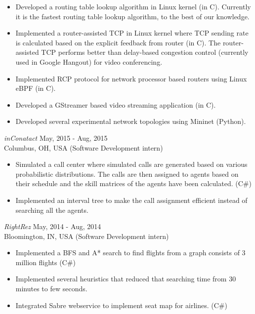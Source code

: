 \documentclass{res}
\begin{document}
\begin{resume}
   \begin{itemize} \itemsep -2pt %
  \item Developed a routing table lookup algorithm in Linux kernel (in C). Currently it is the fastest routing table lookup algorithm, to the best of our knowledge. 
  \item Implemented a router-assisted TCP in Linux kernel where TCP sending rate is calculated based on the explicit feedback from router (in C). The router-assisted TCP performs better than delay-based congestion control (currently used in Google Hangout) for video conferencing.  
  \item Implemented RCP protocol for network processor based routers using Linux eBPF (in C). 
  \item Developed a GStreamer based video streaming application (in C).
  \item Developed several experimental network topologies using Mininet (Python).    	
 \end{itemize}

{\sl inConatact}       \hfill               May, 2015 - Aug, 2015 \\
Columbus, OH, USA \hfill   (Software Development intern)
 \begin{itemize} \itemsep -2pt
	\item  Simulated a call center where simulated calls are generated based on various probabilistic distributions. The calls are then assigned to
	agents based on their schedule and the skill matrices of the agents have been calculated. (C\#)
	\item  Implemented an interval tree to make the call assignment efficient instead of searching all the agents.
  \end{itemize} \vspace{-6pt}

{\sl RightRez}       \hfill               May, 2014 - Aug, 2014 \\
Bloomington, IN, USA \hfill   (Software Development intern)
\begin{itemize} \itemsep -2pt
	\item  Implemented a BFS and A* search to find flights from a graph consists of 3 million flights (C\#)
	\item  Implemented several heuristics that reduced that searching time from 30 minutes to few seconds.
    \item  Integrated Sabre webservice to implement seat map for airlines. (C\#)
\end{itemize} \vspace{-6pt}


\end{resume}
\end{document}
